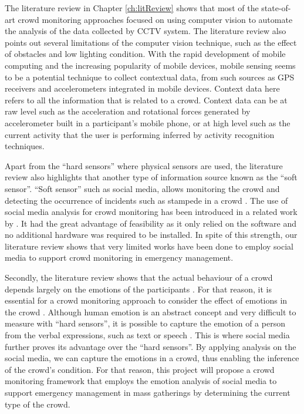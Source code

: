 The literature review in Chapter \ref{ch:litReview} shows that most of the state-of-art crowd monitoring approaches focused on using computer vision to automate the analysis of the data collected by CCTV system. The literature review also points out several limitations of the computer vision technique, such as the effect of obstacles and low lighting condition. With the rapid development of mobile computing and the increasing popularity of mobile devices, mobile sensing seems to be a potential technique to collect contextual data, from such sources as GPS receivers and accelerometers integrated in mobile devices. Context data here refers to all the information that is related to a crowd. Context data can be at raw level such as the acceleration and rotational forces generated by accelerometer built in a participant's mobile phone, or at high level such as the current activity that the user is performing inferred by activity recognition techniques.

Apart from the ``hard sensors'' where physical sensors are used, the literature review also highlights that another type of information source known as the ``soft sensor''. ``Soft sensor'' such as social media, allows monitoring the crowd and detecting the occurrence of incidents such as stampede in a crowd \citep{Ramesh2014}. The use of social media analysis for crowd monitoring has been introduced in a related work by \citet{DelirHaghighi2013}. It had the great advantage of feasibility as it only relied on the software and no additional hardware was required to be installed. In spite of this strength, our literature review shows that very limited works have been done to employ social media to support crowd monitoring in emergency management.

Secondly, the literature review shows that the actual behaviour of a crowd depends largely on the emotions of the participants \citep{Kornblum2011, jasper2011emotions}. For that reason, it is essential for a crowd monitoring approach to consider the effect of emotions in the crowd \citep{mchugh2010perceiving}. Although human emotion is an abstract concept and very difficult to measure with ``hard sensors'', it is possible to capture the emotion of a person from the verbal expressions, such as text \citep{alm2005emotions} or speech \citep{sobin1999emotion}. This is where social media further proves its advantage over the ``hard sensors''. By applying analysis on the social media, we can capture the emotions in a crowd, thus enabling the inference of the crowd's condition. For that reason, this project will propose a crowd monitoring framework that employs the emotion analysis of social media to support emergency management in mass gatherings by determining the current type of the crowd. 

